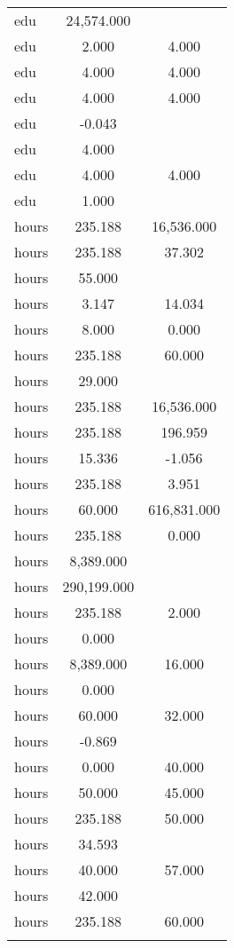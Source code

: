 \documentclass[]{article}
\begin{document}
\begin{tabular}{lcc}
edu & 24,574.000 &  \\
edu & 2.000 & 4.000 \\
edu & 4.000 & 4.000 \\
edu & 4.000 & 4.000 \\
edu & -0.043 &  \\
edu & 4.000 &  \\
edu & 4.000 & 4.000 \\
edu & 1.000 &  \\
hours & 235.188 & 16,536.000 \\
hours & 235.188 & 37.302 \\
hours & 55.000 &  \\
hours & 3.147 & 14.034 \\
hours & 8.000 & 0.000 \\
hours & 235.188 & 60.000 \\
hours & 29.000 &  \\
hours & 235.188 & 16,536.000 \\
hours & 235.188 & 196.959 \\
hours & 15.336 & -1.056 \\
hours & 235.188 & 3.951 \\
hours & 60.000 & 616,831.000 \\
hours & 235.188 & 0.000 \\
hours & 8,389.000 &  \\
hours & 290,199.000 &  \\
hours & 235.188 & 2.000 \\
hours & 0.000 &  \\
hours & 8,389.000 & 16.000 \\
hours & 0.000 &  \\
hours & 60.000 & 32.000 \\
hours & -0.869 &  \\
hours & 0.000 & 40.000 \\
hours & 50.000 & 45.000 \\
hours & 235.188 & 50.000 \\
hours & 34.593 &  \\
hours & 40.000 & 57.000 \\
hours & 42.000 &  \\
hours & 235.188 & 60.000 \\
 &  &  \\ \hline
\end{tabular}
\end{document}
